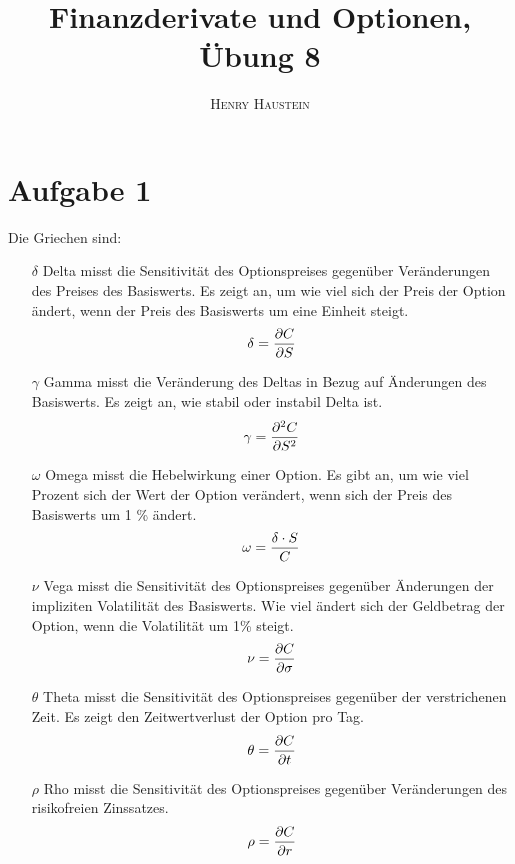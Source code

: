 \documentclass{article}
\title{\textbf{Finanzderivate und Optionen, Übung 8}}
\author{\textsc{Henry Haustein}}
\date{}
\begin{document}
	\maketitle
	
	\section*{Aufgabe 1}
	Die Griechen sind:
	\begin{itemize}
		\item[$\delta$] Delta misst die Sensitivität des Optionspreises gegenüber Veränderungen des Preises des Basiswerts. Es zeigt an, um wie viel sich der Preis der Option ändert, wenn der Preis des Basiswerts um eine Einheit steigt.
		\begin{align}
			\delta = \frac{\partial C}{\partial S} \notag
		\end{align}
		\item[$\gamma$] Gamma misst die Veränderung des Deltas in Bezug auf Änderungen des Basiswerts. Es zeigt an, wie stabil oder instabil Delta ist.
		\begin{align}
			\gamma = \frac{\partial^2 C}{\partial S^2} \notag
		\end{align}
		\item[$\omega$] Omega misst die Hebelwirkung einer Option. Es gibt an, um wie viel Prozent sich der Wert der Option verändert, wenn sich der Preis des Basiswerts um 1 \% ändert.
		\begin{align}
			\omega = \frac{\delta\cdot S}{C} \notag
		\end{align}
		\item[$\nu$] Vega misst die Sensitivität des Optionspreises gegenüber Änderungen der impliziten Volatilität des Basiswerts. Wie viel ändert sich der Geldbetrag der Option, wenn die Volatilität um 1\% steigt.
		\begin{align}
			\nu = \frac{\partial C}{\partial \sigma} \notag
		\end{align}
		\item[$\theta$] Theta misst die Sensitivität des Optionspreises gegenüber der verstrichenen Zeit. Es zeigt den Zeitwertverlust der Option pro Tag.
		\begin{align}
			\theta = \frac{\partial C}{\partial t} \notag
		\end{align}
		\item[$\rho$] Rho misst die Sensitivität des Optionspreises gegenüber Veränderungen des risikofreien Zinssatzes.
		\begin{align}
			\rho = \frac{\partial C}{\partial r} \notag
		\end{align}
	\end{itemize}
\end{document}
